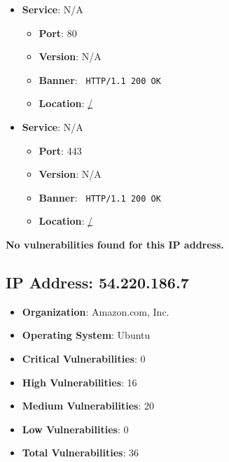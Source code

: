 \documentclass{article}
\begin{document}
\begin{itemize}
    
        \item \textbf{Service}: N/A
        \begin{itemize}
            \item \textbf{Port}: 80
            \item \textbf{Version}:  N/A 
            \item \textbf{Banner}: \texttt{
                HTTP/1.1 200 OK
            }
            \item \textbf{Location}: \href{ / }{ / }
        \end{itemize}
    
        \item \textbf{Service}: N/A
        \begin{itemize}
            \item \textbf{Port}: 443
            \item \textbf{Version}:  N/A 
            \item \textbf{Banner}: \texttt{
                HTTP/1.1 200 OK
            }
            \item \textbf{Location}: \href{ / }{ / }
        \end{itemize}
    
\end{itemize}


\textbf{No vulnerabilities found for this IP address.}




\clearpage



\subsection*{IP Address: 54.220.186.7}

\begin{itemize}
    \item \textbf{Organization}: Amazon.com, Inc.
    \item \textbf{Operating System}:  Ubuntu 
    \item \textbf{Critical Vulnerabilities}: 0
    \item \textbf{High Vulnerabilities}: 16
    \item \textbf{Medium Vulnerabilities}: 20
    \item \textbf{Low Vulnerabilities}: 0
    \item \textbf{Total Vulnerabilities}: 36
\end{itemize}
\end{document}

